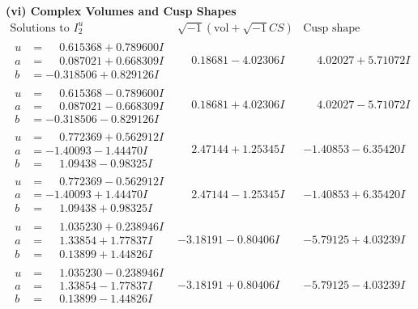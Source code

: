 \documentclass[1p]{elsarticle_modified}
\theoremstyle{definition}
\newcommand{\I}{\sqrt{-1}}
\begin{document}
\newpage\flushleft \textbf{(vi) Complex Volumes and Cusp Shapes}
$$\begin{array}{c|c|c}  
\text{Solutions to }I^u_{2}& \I (\text{vol} + \sqrt{-1}CS) & \text{Cusp shape}\\
 \hline 
\begin{aligned}
u &= \phantom{-}0.615368 + 0.789600 I \\
a &= \phantom{-}0.087021 + 0.668309 I \\
b &= -0.318506 + 0.829126 I\end{aligned}
 & \phantom{-}0.18681 - 4.02306 I & \phantom{-}4.02027 + 5.71072 I \\ \hline\begin{aligned}
u &= \phantom{-}0.615368 - 0.789600 I \\
a &= \phantom{-}0.087021 - 0.668309 I \\
b &= -0.318506 - 0.829126 I\end{aligned}
 & \phantom{-}0.18681 + 4.02306 I & \phantom{-}4.02027 - 5.71072 I \\ \hline\begin{aligned}
u &= \phantom{-}0.772369 + 0.562912 I \\
a &= -1.40093 - 1.44470 I \\
b &= \phantom{-}1.09438 - 0.98325 I\end{aligned}
 & \phantom{-}2.47144 + 1.25345 I & -1.40853 - 6.35420 I \\ \hline\begin{aligned}
u &= \phantom{-}0.772369 - 0.562912 I \\
a &= -1.40093 + 1.44470 I \\
b &= \phantom{-}1.09438 + 0.98325 I\end{aligned}
 & \phantom{-}2.47144 - 1.25345 I & -1.40853 + 6.35420 I \\ \hline\begin{aligned}
u &= \phantom{-}1.035230 + 0.238946 I \\
a &= \phantom{-}1.33854 + 1.77837 I \\
b &= \phantom{-}0.13899 + 1.44826 I\end{aligned}
 & -3.18191 - 0.80406 I & -5.79125 + 4.03239 I \\ \hline\begin{aligned}
u &= \phantom{-}1.035230 - 0.238946 I \\
a &= \phantom{-}1.33854 - 1.77837 I \\
b &= \phantom{-}0.13899 - 1.44826 I\end{aligned}
 & -3.18191 + 0.80406 I & -5.79125 - 4.03239 I \\ \hline\begin{aligned}

\end{aligned}
\end{array}$$
\end{document}
